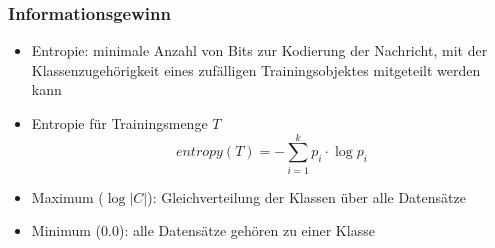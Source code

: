 






\begin{frame}
\frametitle{Informationsgewinn}

\begin{itemize}
\item Entropie: minimale Anzahl von Bits zur Kodierung der Nachricht,
  mit der Klassenzugehörigkeit eines zufälligen Trainingsobjektes
  mitgeteilt werden kann
\item Entropie für Trainingsmenge $T$
$$
\textit{entropy}(T)=-\sum_{i=1}^k p_i \cdot \log p_i
$$
\item Maximum ($\log |C|$): Gleichverteilung der Klassen über
  alle Datensätze
\item Minimum ($0.0$): alle Datensätze gehören zu einer Klasse
\end{itemize}

\end{frame}


